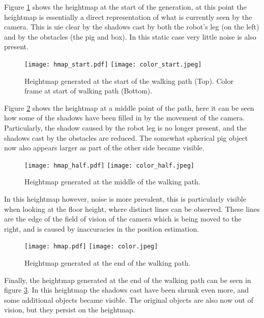         \newpage
        \noindent
        Figure \ref{fig:hardware_hmap_start} shows the heightmap at the start of the generation, at this point the heightmap is essentially a direct representation of what is
        currently seen by the camera. This is uie clear by the shadows cast by both the robot's leg (on the left) and by the obstacles (the pig and box). In this static case
        very little noise is also present.
        \begin{figure}[h]
            \centering
            \texttt{[image: hmap\_start.pdf]}
            \texttt{[image: color\_start.jpeg]}
            \caption{Heightmap generated at the start of the walking path (Top). Color frame at start of walking path (Bottom).}
            \label{fig:hardware_hmap_start}
        \end{figure}
        
        \newpage
        \noindent
        Figure \ref{fig:hardware_hmap_mid} shows the heightmap at a middle point of the path, here it can be seen how some of the shadows have been
        filled in by the movement of the camera. Particularly, the shadow caused by the robot leg is no longer present, and the shadows cast by the
        obstacles are reduced. The somewhat spherical pig object now also appears larger as part of the other side became visible.
        \begin{figure}[h]
            \centering
            \texttt{[image: hmap\_half.pdf]}
            \texttt{[image: color\_half.jpeg]}
            \caption{Heightmap generated at the middle of the walking path.}
            \label{fig:hardware_hmap_mid}
        \end{figure}

        \noindent
        In this heightmap however, noise is more prevalent, this is particularly visible when looking at the floor height, where distinct lines can be observed.
        These lines are the edge of the field of vision of the camera which is being moved to the right, and is caused by inaccuracies in the position estimation.

        \begin{figure}[h]
            \centering
            \texttt{[image: hmap.pdf]}
            \texttt{[image: color.jpeg]}
            \caption{Heightmap generated at the end of the walking path.}
            \label{fig:hardware_hmap}
        \end{figure}

        \noindent
        Finally, the heightmap generated at the end of the walking path can be seen in figure \ref{fig:hardware_hmap}. In this heightmap the shadows cast
        have been shrunk even more, and some additional objects became visible. The original objects are also now out of vision, but they persist on the heightmap. 

